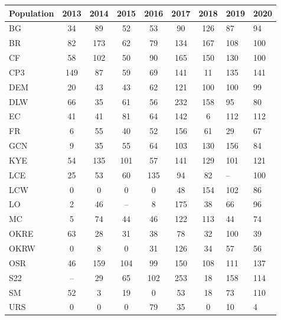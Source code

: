 \documentclass[varwidth=\maxdimen,border=1pt]{standalone}
\begin{document}
 
\begin{tabular}{lcccccc}
  \hline
Population & 2013 & 2014 & 2015 & 2016 & 2017 & 2018 & 2019 & 2020 \\ 
  \hline
BG &  34 &  89 &  52 &  53 &  90 & 126 &  87 &  94 \\ 
  BR &  82 & 173 &  62 &  79 & 134 & 167 & 108 & 100 \\ 
  CF &  58 & 102 &  50 &  90 & 165 & 150 & 130 & 100 \\ 
  CP3 & 149 &  87 &  59 &  69 & 141 &  11 & 135 & 141 \\ 
  DEM &  20 &  43 &  43 &  62 & 121 & 100 & 100 &  99 \\ 
  DLW &  66 &  35 &  61 &  56 & 232 & 158 &  95 &  80 \\ 
  EC &  41 &  41 &  81 &  64 & 142 &   6 & 112 & 112 \\ 
  FR &   6 &  55 &  40 &  52 & 156 &  61 &  29 &  67 \\ 
  GCN &   9 &  35 &  55 &  64 & 103 & 130 & 156 &  84 \\ 
  KYE &  54 & 135 & 101 &  57 & 141 & 129 & 101 & 121 \\ 
  LCE &  25 &  53 &  60 & 135 &  94 &  82 & -- & 100 \\ 
  LCW &   0 &   0 &   0 &   0 &  48 & 154 & 102 &  86 \\ 
  LO &   2 &  46 & -- &   8 & 175 &  38 &  66 &  96 \\ 
  MC &   5 &  74 &  44 &  46 & 122 & 113 &  44 &  74 \\ 
  OKRE &  63 &  28 &  31 &  38 &  78 &  32 & 100 &  39 \\ 
  OKRW &   0 &   8 &   0 &  31 & 126 &  34 &  57 &  56 \\ 
  OSR &  46 & 159 & 104 &  99 & 150 & 108 & 111 & 137 \\ 
  S22 & -- &  29 &  65 & 102 & 253 &  18 & 158 & 114 \\ 
  SM &  52 &   3 &  19 &   0 &  53 &  18 &  73 & 110 \\ 
  URS &   0 &   0 &   0 &  79 &  35 &   0 &  10 &   4 \\      \hline
\end{tabular}
 
\end{document}
